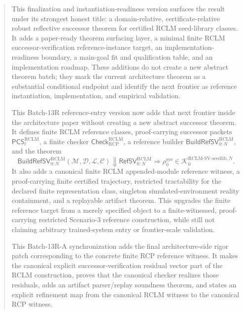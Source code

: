 \documentclass[11pt,a4paper]{article}
\newcommand{\Kcal}{\mathcal K}
\newcommand{\RCP}{\mathrm{RCP}}
\newcommand{\RCLM}{\mathrm{RCLM}}
\newcommand{\sys}{\mathrm{sys}}
\begin{document}
\begin{abstract}
This finalization and instantiation-readiness version surfaces the result under its strongest honest title: a domain-relative, certificate-relative robust reflective successor theorem for certified RCLM seed-library classes.  It adds a paper-ready theorem surfacing layer, a minimal finite RCLM successor-verification reference-instance target, an implementation-readiness boundary, a main-goal fit and qualification table, and an implementation roadmap.  These additions do not create a new abstract theorem batch; they mark the current architecture theorem as a substantial conditional endpoint and identify the next frontier as reference instantiation, implementation, and empirical validation.

This Batch-13R reference-entry version now adds that next frontier inside the architecture paper without creating a new abstract successor theorem.  It defines finite RCLM reference classes, proof-carrying successor packets \(\mathsf{PCS}_t^{\RCLM}\), a finite checker \(\mathsf{Check}_{\RCP}^{\RCLM}\), a reference builder \(\mathsf{BuildRefSV}_{0:N}^{\RCLM}\), and the theorem
\[
\mathsf{BuildRefSV}_{0:N}^{\RCLM}(\mathcal M,\mathcal D,\mathcal L,\mathcal C)
\Downarrow
\mathsf{RefSV}_{0:N}^{\RCLM}
\Longrightarrow
\rho_0^{\sys}\in
\Kcal_0^{\RCLM\text{-}\mathrm{SV\mbox{-}seedlib},N}.
\]
It also adds a canonical finite RCLM appended-module reference witness, a proof-carrying finite certified trajectory, restricted tractability for the declared finite representation class, singleton simulated-environment reality containment, and a replayable artifact theorem.  This upgrades the finite reference target from a merely specified object to a finite-witnessed, proof-carrying restricted Scenario-3 reference construction, while still not claiming arbitrary trained-system entry or frontier-scale validation.

This Batch-13R-A synchronization adds the final architecture-side rigor patch corresponding to the concrete finite RCP reference witness. It makes the canonical explicit successor-verification residual vector part of the RCLM construction, proves that the canonical checker realizes those residuals, adds an artifact parser/replay soundness theorem, and states an explicit refinement map from the canonical RCLM witness to the canonical RCP witness.


\end{abstract}
\end{document}
